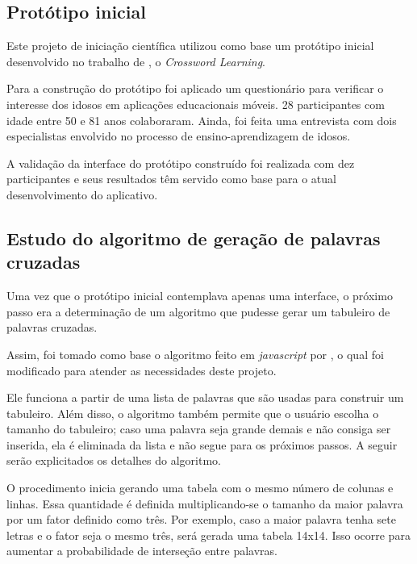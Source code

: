 \subsection{Protótipo inicial}
\label{subsec:prototipoInicial}
Este projeto de iniciação científica utilizou como base um protótipo inicial desenvolvido no trabalho de \cite{oliveira2018crossword}, o \textit{Crossword Learning}.

Para a construção do protótipo foi aplicado um questionário para verificar o interesse dos idosos em aplicações educacionais móveis. 28 participantes com idade entre 50 e 81 anos colaboraram. Ainda, foi feita uma entrevista com dois especialistas envolvido no processo de ensino-aprendizagem de idosos.

A validação da interface do protótipo construído foi realizada com dez participantes e seus resultados têm servido como base para o atual desenvolvimento do aplicativo. 


\subsection{Estudo do algoritmo de geração de palavras cruzadas}
Uma vez que o protótipo inicial contemplava apenas uma interface, o próximo passo era a determinação de um algoritmo que pudesse gerar um tabuleiro de palavras cruzadas. 

Assim, foi tomado como base o algoritmo feito em \textit{javascript} por \cite{layoutGenerator}, o qual foi modificado para atender as necessidades deste projeto. 

Ele funciona a partir de uma lista de palavras que são usadas para construir um tabuleiro. Além disso, o algoritmo também permite que o usuário escolha o tamanho do tabuleiro; caso uma palavra seja grande demais e não consiga ser inserida, ela é eliminada da lista e não segue para os próximos passos. A seguir serão explicitados os detalhes do algoritmo.

O procedimento inicia gerando uma tabela com o mesmo número de colunas e linhas. Essa quantidade é definida multiplicando-se o tamanho da maior palavra por um fator definido como três. Por exemplo, caso a maior palavra tenha sete letras e o fator seja o mesmo três, será gerada uma tabela 14x14. Isso ocorre para aumentar a probabilidade de interseção entre palavras. 

